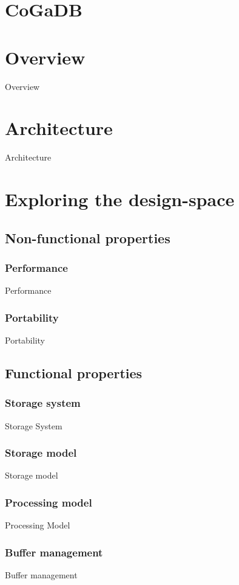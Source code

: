 \documentclass[a4paper, 11pt]{article}
\begin{document}
\section*{CoGaDB}
\section*{Overview}
Overview

\section*{Architecture}
Architecture

\section*{Exploring the design-space}
\subsection*{Non-functional properties}
\subsubsection*{Performance}
Performance

\subsubsection*{Portability}
Portability

\subsection*{Functional properties}
\subsubsection*{Storage system}
Storage System

\subsubsection*{Storage model}
Storage model

\subsubsection*{Processing model}
Processing Model

\subsubsection*{Buffer management}
Buffer management
\end{document}

